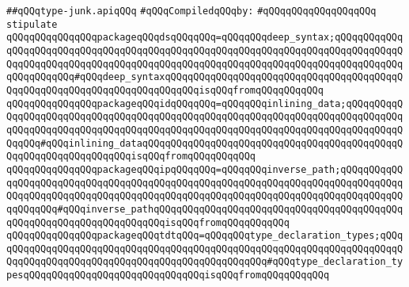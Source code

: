 \label{src/lib/compiler/front/typer-stuff/types/type-junk.api}
\verb|##qQQqtype-junk.apiqQQq|\newline
\newline
\verb|#qQQqCompiledqQQqby:|\newline
\verb|#qQQqqQQqqQQqqQQqqQQq|\newline
\newline
\newline
\newline
\verb|stipulate|\newline
\verb|qQQqqQQqqQQqqQQqpackageqQQqdsqQQqqQQq=qQQqqQQqdeep_syntax;qQQqqQQqqQQqqQQqqQQqqQQqqQQqqQQqqQQqqQQqqQQqqQQqqQQqqQQqqQQqqQQqqQQqqQQqqQQqqQQqqQQqqQQqqQQqqQQqqQQqqQQqqQQqqQQqqQQqqQQqqQQqqQQqqQQqqQQqqQQqqQQqqQQqqQQqqQQqqQQqqQQq#qQQqdeep_syntaxqQQqqQQqqQQqqQQqqQQqqQQqqQQqqQQqqQQqqQQqqQQqqQQqqQQqqQQqqQQqqQQqqQQqqQQqqQQqisqQQqfromqQQqqQQqqQQq|\newline
\verb|qQQqqQQqqQQqqQQqpackageqQQqidqQQqqQQq=qQQqqQQqinlining_data;qQQqqQQqqQQqqQQqqQQqqQQqqQQqqQQqqQQqqQQqqQQqqQQqqQQqqQQqqQQqqQQqqQQqqQQqqQQqqQQqqQQqqQQqqQQqqQQqqQQqqQQqqQQqqQQqqQQqqQQqqQQqqQQqqQQqqQQqqQQqqQQqqQQqqQQqqQQq#qQQqinlining_dataqQQqqQQqqQQqqQQqqQQqqQQqqQQqqQQqqQQqqQQqqQQqqQQqqQQqqQQqqQQqqQQqqQQqisqQQqfromqQQqqQQqqQQq|\newline
\verb|qQQqqQQqqQQqqQQqpackageqQQqipqQQqqQQq=qQQqqQQqinverse_path;qQQqqQQqqQQqqQQqqQQqqQQqqQQqqQQqqQQqqQQqqQQqqQQqqQQqqQQqqQQqqQQqqQQqqQQqqQQqqQQqqQQqqQQqqQQqqQQqqQQqqQQqqQQqqQQqqQQqqQQqqQQqqQQqqQQqqQQqqQQqqQQqqQQqqQQqqQQqqQQq#qQQqinverse_pathqQQqqQQqqQQqqQQqqQQqqQQqqQQqqQQqqQQqqQQqqQQqqQQqqQQqqQQqqQQqqQQqqQQqqQQqisqQQqfromqQQqqQQqqQQq|\newline
\verb|qQQqqQQqqQQqqQQqpackageqQQqtdtqQQq=qQQqqQQqtype_declaration_types;qQQqqQQqqQQqqQQqqQQqqQQqqQQqqQQqqQQqqQQqqQQqqQQqqQQqqQQqqQQqqQQqqQQqqQQqqQQqqQQqqQQqqQQqqQQqqQQqqQQqqQQqqQQqqQQqqQQqqQQq#qQQqtype_declaration_typesqQQqqQQqqQQqqQQqqQQqqQQqqQQqqQQqisqQQqfromqQQqqQQqqQQq|\newline
